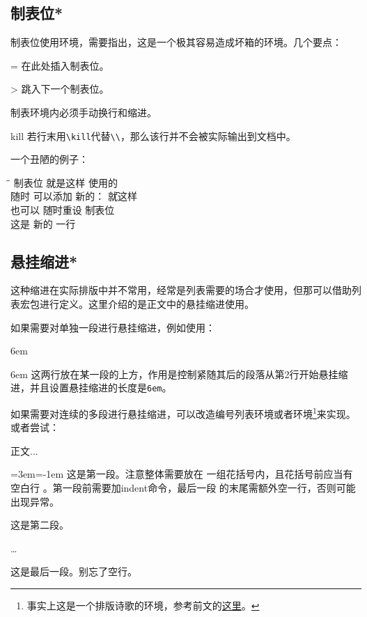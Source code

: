 \subsection{制表位*}
制表位使用环境，需要指出，这是一个极其容易造成坏箱的环境。几个要点：
\begin{para}
\item[\char92{}=] 在此处插入制表位。
\item[\char92{}>] 跳入下一个制表位。
\item[\char92{}\char92{}] 制表环境内必须手动换行和缩进。
\item[\char92{}kill] 若行末用\verb|\kill|代替\verb|\\|，那么该行并不会被实际输出到文档中。
\end{para}

一个丑陋的例子：
\begin{codeshowabove}
\begin{tabbing}
\hspace{4em}\=\hspace{8em}\=\kill
制表位 \> 就是这样 \> 使用的 \\
随时 \> 可以添加 \> 新的： \= 就这样 \\
也可以 \= 随时重设 \= 制表位 \\
这是 \> 新的 \> 一行
\end{tabbing}
\end{codeshowabove}

\subsection{悬挂缩进*}
这种缩进在实际排版中并不常用，经常是列表需要的场合才使用，但那可以借助列表宏包进行定义。这里介绍的是正文中的悬挂缩进使用。

如果需要对单独一段进行悬挂缩进，例如使用：
\begin{latex}
\hangindent 6em
\end{latex}

\hangindent 6em
这两行放在某一段的上方，作用是控制紧随其后的段落从第2行开始悬挂缩进，并且设置悬挂缩进的长度是\texttt{6em}。

如果需要对连续的多段进行悬挂缩进，可以改造编号列表环境或者环境\footnote{事实上这是一个排版诗歌的环境，参考前文的\hyperref[envi:verse]{这里}。}来实现。或者尝试：

\begin{codeshow}
正文...

{\leftskip=3em\parindent=-1em
\indent 这是第一段。注意整体需要放在
一组花括号内，且花括号前应当有空白行
。第一段前需要加indent命令，最后一段
的末尾需额外空一行，否则可能出现异常。

这是第二段。

\ldots

这是最后一段。别忘了空行。

}
\end{codeshow}

